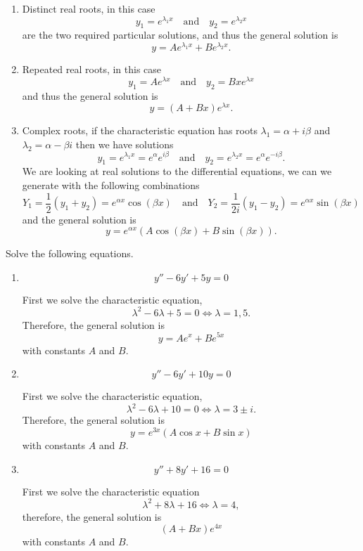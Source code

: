 \begin{enumerate}
    \item Distinct real roots, in this case \[y_1=e^{\lambda_1x}\quad\text{and}\quad y_2=e^{\lambda_2x}\] are the two required particular solutions, and thus the general solution is \[y=Ae^{\lambda_1x}+Be^{\lambda_2x}.\]
    
    \item Repeated real roots, in this case \[y_1=Ae^{\lambda x}\quad\text{and}\quad y_2=Bxe^{\lambda x}\] and thus the general solution is \[y=(A+Bx)e^{\lambda x}.\]
    
    \item Complex roots, if the characteristic equation has roots $\lambda_1=\alpha+i\beta$ and $\lambda_2=\alpha-\beta i$ then we have solutions \[y_1=e^{\lambda_1x}=e^{\alpha}e^{i\beta}\quad\text{and}\quad y_2=e^{\lambda_2 x}=e^{\alpha}e^{-i\beta}.\] We are looking at real solutions to the differential equations, we can we generate with the following combinations \[Y_1=\frac12(y_1+y_2)=e^{\alpha x}\cos{(\beta x)}\quad\text{and}\quad Y_2=\frac1{2i}(y_1-y_2)=e^{\alpha x}\sin{(\beta x)}\] and the general solution is \[y=e^{\alpha x}(A\cos{(\beta x)}+B\sin{(\beta x)}).\]
\end{enumerate}

\begin{example}
    Solve the following equations.
    \begin{enumerate}
        \item \[y''-6y'+5y=0\]
        
        First we solve the characteristic equation, \[\lambda^2-6\lambda+5=0\iff\lambda=1,5.\] Therefore, the general solution is \[y=Ae^x+Be^{5x}\] with constants $A$ and $B$.
        
        \item \[y''-6y'+10y=0\]
        
        First we solve the characteristic equation, \[\lambda^2-6\lambda+10=0\iff\lambda=3\pm i.\] Therefore, the general solution is \[y=e^{3x}(A\cos{x}+B\sin{x})\] with constants $A$ and $B$.
        
        \item \[y''+8y'+16=0\]
        
        First we solve the characteristic equation \[\lambda^2+8\lambda+16\iff\lambda=4,\] therefore, the general solution is \[(A+Bx)e^{4x}\] with constants $A$ and $B$.
    \end{enumerate}
\end{example}

